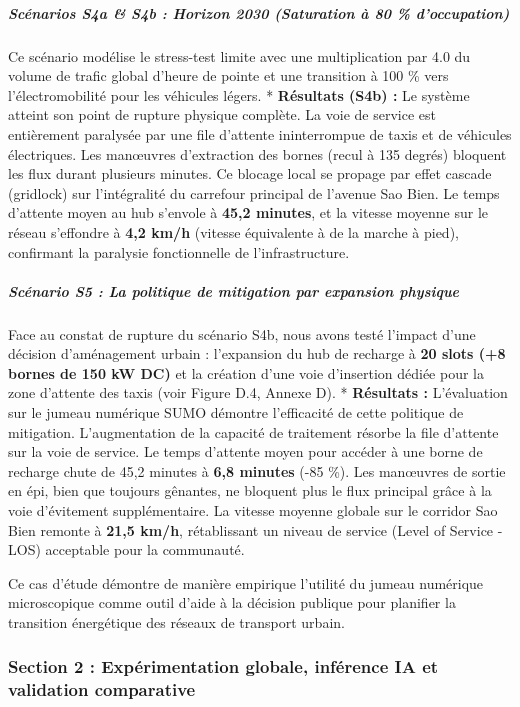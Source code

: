 \documentclass[10pt, a4paper]{article}
\begin{document}
\subparagraph{Scénarios S4a \& S4b : Horizon 2030 (Saturation à 80 \%
d'occupation)}\label{scuxe9narios-s4a-s4b-horizon-2030-saturation-uxe0-80-doccupation}

Ce scénario modélise le stress-test limite avec une multiplication par
4.0 du volume de trafic global d'heure de pointe et une transition à 100
\% vers l'électromobilité pour les véhicules légers. * \textbf{Résultats
(S4b) :} Le système atteint son point de rupture physique complète. La
voie de service est entièrement paralysée par une file d'attente
ininterrompue de taxis et de véhicules électriques. Les manœuvres
d'extraction des bornes (recul à 135 degrés) bloquent les flux durant
plusieurs minutes. Ce blocage local se propage par effet cascade
(gridlock) sur l'intégralité du carrefour principal de l'avenue Sao
Bien. Le temps d'attente moyen au hub s'envole à \textbf{45,2 minutes},
et la vitesse moyenne sur le réseau s'effondre à \textbf{4,2 km/h}
(vitesse équivalente à de la marche à pied), confirmant la paralysie
fonctionnelle de l'infrastructure.

\subparagraph{Scénario S5 : La politique de mitigation par expansion
physique}\label{scuxe9nario-s5-la-politique-de-mitigation-par-expansion-physique}

Face au constat de rupture du scénario S4b, nous avons testé l'impact
d'une décision d'aménagement urbain : l'expansion du hub de recharge à
\textbf{20 slots (+8 bornes de 150 kW DC)} et la création d'une voie
d'insertion dédiée pour la zone d'attente des taxis (voir Figure D.4,
Annexe D). * \textbf{Résultats :} L'évaluation sur le jumeau numérique
SUMO démontre l'efficacité de cette politique de mitigation.
L'augmentation de la capacité de traitement résorbe la file d'attente
sur la voie de service. Le temps d'attente moyen pour accéder à une
borne de recharge chute de 45,2 minutes à \textbf{6,8 minutes} (-85 \%).
Les manœuvres de sortie en épi, bien que toujours gênantes, ne bloquent
plus le flux principal grâce à la voie d'évitement supplémentaire. La
vitesse moyenne globale sur le corridor Sao Bien remonte à \textbf{21,5
km/h}, rétablissant un niveau de service (Level of Service - LOS)
acceptable pour la communauté.

Ce cas d'étude démontre de manière empirique l'utilité du jumeau
numérique microscopique comme outil d'aide à la décision publique pour
planifier la transition énergétique des réseaux de transport urbain.

\subsubsection{Section 2 : Expérimentation globale, inférence IA et
validation
comparative}\label{section-2-expuxe9rimentation-globale-infuxe9rence-ia-et-validation-comparative}
\end{document}
